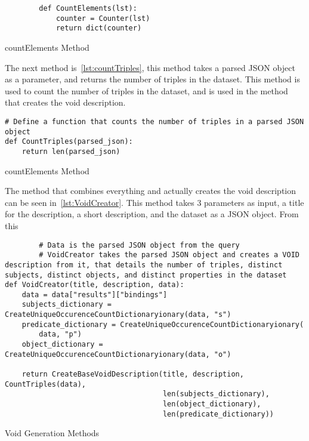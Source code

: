 \begin{listing}[htb!]
    \begin{verbatim}
        def CountElements(lst):
            counter = Counter(lst)
            return dict(counter)
    \end{verbatim}
    \caption{countElements Method}
    \label{lst:countElements}
\end{listing}

The next method is~\ref{lst:countTriples}, this method takes a parsed JSON object as a parameter, and returns the number of triples in the dataset. This method is used to count the number of triples in the dataset, and is used in the method that creates the void description.

\begin{listing}[htb!]
    \begin{verbatim}
# Define a function that counts the number of triples in a parsed JSON object
def CountTriples(parsed_json):
    return len(parsed_json)
    \end{verbatim}
    \caption{countElements Method}
    \label{lst:countElements}
\end{listing}

The method that combines everything and actually creates the \gls{void} description can be seen in~\ref{lst:VoidCreator}. This method takes 3 parameters as input, a title for the description, a short description, and the dataset as a JSON object. From this

\begin{listing}[htb!]
    \begin{verbatim}
        # Data is the parsed JSON object from the query
        # VoidCreator takes the parsed JSON object and creates a VOID description from it, that details the number of triples, distinct subjects, distinct objects, and distinct properties in the dataset
def VoidCreator(title, description, data):
    data = data["results"]["bindings"]
    subjects_dictionary = CreateUniqueOccurenceCountDictionaryionary(data, "s")
    predicate_dictionary = CreateUniqueOccurenceCountDictionaryionary(
        data, "p")
    object_dictionary = CreateUniqueOccurenceCountDictionaryionary(data, "o")

    return CreateBaseVoidDescription(title, description, CountTriples(data),
                                     len(subjects_dictionary),
                                     len(object_dictionary),
                                     len(predicate_dictionary))
    \end{verbatim}
    \caption{Void Generation Methods}
    \label{lst:VoidCreator}
\end{listing}



